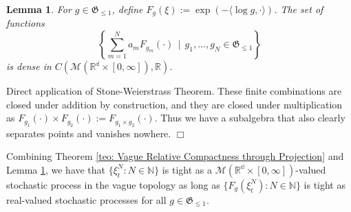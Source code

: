 \documentclass[12pt]{article}
\newenvironment {proof}{{\noindent\bf Proof }}{\hfill $\Box$ \medskip}
\newtheorem{lemma}[theorem]{Lemma}
\begin{document}
\begin{lemma}\label{lem: Dense set for test functions on empirical measures} For $g \in \mathfrak{G}_{\leq 1}$, define $F_g(\xi):= \exp(-\langle \log g, \cdot \rangle )$. The set of functions 
$$\left\{\sum_{m=1}^{N}a_m F_{g_m}(\cdot) ~~|~~ g_1,...,g_N \in \mathfrak{G}_{\leq 1}\right\}$$
is dense in $C(\mathcal{M}(\mathbb{R^d} \times [0, \infty]),\mathbb{R})$.
\end{lemma}
\begin{proof}
Direct application of Stone-Weierstrass Theorem. These finite combinations are closed under addition by construction, and they are closed under multiplication as $F_{g_1}(\cdot) \times F_{g_2}(\cdot):=F_{g_1 \times g_2}(\cdot)$. Thus we have a subalgebra that also clearly separates points and vanishes nowhere.
\end{proof}


Combining Theorem \ref{teo: Vague Relative Compactness through Projection} and Lemma \ref{lem: Dense set for test functions on empirical measures}, we have that $\{\xi^N_t: N \in \mathbb{N}\}$ is tight as a $\mathcal{M}(\mathbb{R^d} \times [0, \infty])$-valued stochastic process in the vague topology as long as $\{F_g(\xi^N_t): N \in \mathbb{N}\}$ is tight as real-valued stochastic processes
for all $g \in \mathfrak{G}_{\leq 1}$. 


\end{document}
